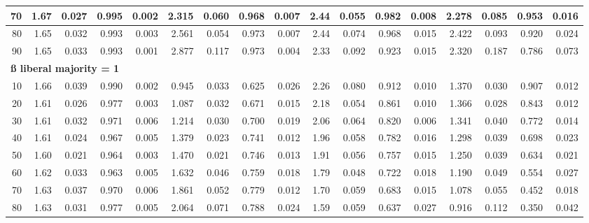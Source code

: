 \documentclass[
]{article}
\begin{document}
\begin{table}[H]
{\begin{tabular}{r|r|r|r|r|r|r|r|r|r|r|r|r|r|r|r|r}
\hline
\hspace{1em}70 & 1.67 & 0.027 & 0.995 & 0.002 & 2.315 & 0.060 & 0.968 & 0.007 & 2.44 & 0.055 & 0.982 & 0.008 & 2.278 & 0.085 & 0.953 & 0.016\\
\hline
\hspace{1em}80 & 1.65 & 0.032 & 0.993 & 0.003 & 2.561 & 0.054 & 0.973 & 0.007 & 2.44 & 0.074 & 0.968 & 0.015 & 2.422 & 0.093 & 0.920 & 0.024\\
\hline
\hspace{1em}90 & 1.65 & 0.033 & 0.993 & 0.001 & 2.877 & 0.117 & 0.973 & 0.004 & 2.33 & 0.092 & 0.923 & 0.015 & 2.320 & 0.187 & 0.786 & 0.073\\
\hline
\multicolumn{17}{l}{\textbf{ß liberal majority = 1}}\\
\hline
\hspace{1em}10 & 1.66 & 0.039 & 0.990 & 0.002 & 0.945 & 0.033 & 0.625 & 0.026 & 2.26 & 0.080 & 0.912 & 0.010 & 1.370 & 0.030 & 0.907 & 0.012\\
\hline
\hspace{1em}20 & 1.61 & 0.026 & 0.977 & 0.003 & 1.087 & 0.032 & 0.671 & 0.015 & 2.18 & 0.054 & 0.861 & 0.010 & 1.366 & 0.028 & 0.843 & 0.012\\
\hline
\hspace{1em}30 & 1.61 & 0.032 & 0.971 & 0.006 & 1.214 & 0.030 & 0.700 & 0.019 & 2.06 & 0.064 & 0.820 & 0.006 & 1.341 & 0.040 & 0.772 & 0.014\\
\hline
\hspace{1em}40 & 1.61 & 0.024 & 0.967 & 0.005 & 1.379 & 0.023 & 0.741 & 0.012 & 1.96 & 0.058 & 0.782 & 0.016 & 1.298 & 0.039 & 0.698 & 0.023\\
\hline
\hspace{1em}50 & 1.60 & 0.021 & 0.964 & 0.003 & 1.470 & 0.021 & 0.746 & 0.013 & 1.91 & 0.056 & 0.757 & 0.015 & 1.250 & 0.039 & 0.634 & 0.021\\
\hline
\hspace{1em}60 & 1.62 & 0.033 & 0.963 & 0.005 & 1.632 & 0.046 & 0.759 & 0.018 & 1.79 & 0.048 & 0.722 & 0.018 & 1.190 & 0.049 & 0.554 & 0.027\\
\hline
\hspace{1em}70 & 1.63 & 0.037 & 0.970 & 0.006 & 1.861 & 0.052 & 0.779 & 0.012 & 1.70 & 0.059 & 0.683 & 0.015 & 1.078 & 0.055 & 0.452 & 0.018\\
\hline
\hspace{1em}80 & 1.63 & 0.031 & 0.977 & 0.005 & 2.064 & 0.071 & 0.788 & 0.024 & 1.59 & 0.059 & 0.637 & 0.027 & 0.916 & 0.112 & 0.350 & 0.042\\

\end{tabular}}
\end{table}
\end{document}
